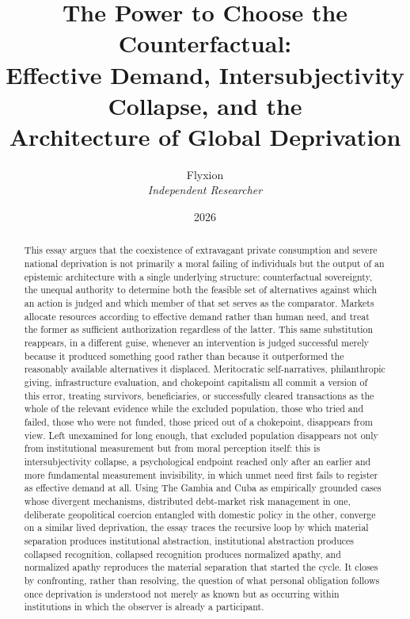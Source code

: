 \documentclass[11pt]{article}
\title{The Power to Choose the Counterfactual:\\ Effective Demand, Intersubjectivity Collapse, and the\\ Architecture of Global Deprivation}
\author{Flyxion\\ \textit{Independent Researcher}}
\date{2026}
\begin{document}
\maketitle

\begin{abstract}
\noindent This essay argues that the coexistence of extravagant private consumption and severe national deprivation is not primarily a moral failing of individuals but the output of an epistemic architecture with a single underlying structure: counterfactual sovereignty, the unequal authority to determine both the feasible set of alternatives against which an action is judged and which member of that set serves as the comparator. Markets allocate resources according to effective demand rather than human need, and treat the former as sufficient authorization regardless of the latter. This same substitution reappears, in a different guise, whenever an intervention is judged successful merely because it produced something good rather than because it outperformed the reasonably available alternatives it displaced. Meritocratic self-narratives, philanthropic giving, infrastructure evaluation, and chokepoint capitalism all commit a version of this error, treating survivors, beneficiaries, or successfully cleared transactions as the whole of the relevant evidence while the excluded population, those who tried and failed, those who were not funded, those priced out of a chokepoint, disappears from view. Left unexamined for long enough, that excluded population disappears not only from institutional measurement but from moral perception itself: this is intersubjectivity collapse, a psychological endpoint reached only after an earlier and more fundamental measurement invisibility, in which unmet need first fails to register as effective demand at all. Using The Gambia and Cuba as empirically grounded cases whose divergent mechanisms, distributed debt-market risk management in one, deliberate geopolitical coercion entangled with domestic policy in the other, converge on a similar lived deprivation, the essay traces the recursive loop by which material separation produces institutional abstraction, institutional abstraction produces collapsed recognition, collapsed recognition produces normalized apathy, and normalized apathy reproduces the material separation that started the cycle. It closes by confronting, rather than resolving, the question of what personal obligation follows once deprivation is understood not merely as known but as occurring within institutions in which the observer is already a participant.
\end{abstract}
\end{document}

